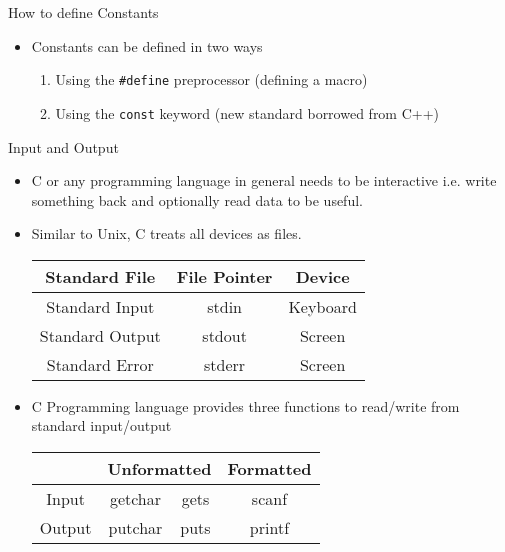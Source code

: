 \documentclass[10pt,t]{beamer}
\begin{document}
\begin{frame}[fragile]{How to define Constants}
  \begin{itemize}
    \item Constants can be defined in two ways
    \begin{enumerate}
      \item Using the \lstinline{#define} preprocessor (defining a macro)
      \item Using the \lstinline{const} keyword (new standard borrowed from C++)
    \end{enumerate}
  \end{itemize}
  
\end{frame}

\begin{frame}{Input and Output}
  \begin{itemize}
    \item C or any programming language in general needs to be interactive i.e. write something back and optionally read data to be useful.
    \item Similar to Unix, C treats all devices as files.
      \begin{center}
        \begin{tabular}{ccc}
          \hline
          Standard File & File Pointer & Device \\
          \hline
          Standard Input & stdin & Keyboard \\
          Standard Output & stdout & Screen \\
          Standard Error & stderr & Screen\\
          \hline
        \end{tabular}
      \end{center}
      
    \item C Programming language provides three functions to read/write from standard input/output
      \begin{center}
        \begin{tabular}{|c|c|c|c|}
          \hline
          & \multicolumn{2}{c|}{Unformatted} & Formatted \\
          \hline
          Input & getchar & gets & scanf \\
          Output & putchar & puts & printf \\
          \hline
        \end{tabular}
      \end{center}
  \end{itemize}
\end{frame}
\end{document}
